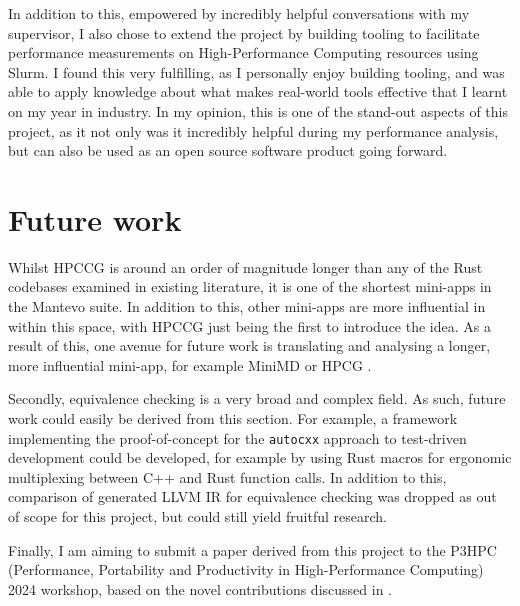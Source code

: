 In addition to this, empowered by incredibly helpful conversations with my supervisor, I also chose to extend the project by building tooling to facilitate performance measurements on High-Performance Computing resources using Slurm. I found this very fulfilling, as I personally enjoy building tooling, and was able to apply knowledge about what makes real-world tools effective that I learnt on my year in industry. In my opinion, this is one of the stand-out aspects of this project, as it not only was it incredibly helpful during my performance analysis, but can also be used as an open source software product going forward.


\section{Future work}
\label{sec:future-work}

Whilst HPCCG is around an order of magnitude longer than any of the Rust codebases examined in existing literature, it is one of the shortest mini-apps in the Mantevo suite. In addition to this, other mini-apps are more influential in within this space, with HPCCG just being the first to introduce the idea. As a result of this, one avenue for future work is translating and analysing a longer, more influential mini-app, for example MiniMD \cite{osti_1231191} or HPCG \cite{dongarra2015hpcg}.

Secondly, equivalence checking is a very broad and complex field. As such, future work could easily be derived from this section. For example, a framework implementing the proof-of-concept for the \texttt{autocxx} approach to test-driven development could be developed, for example by using Rust macros for ergonomic multiplexing between C++ and Rust function calls. In addition to this, comparison of generated LLVM IR for equivalence checking was dropped as out of scope for this project, but could still yield fruitful research.


Finally, I am aiming to submit a paper derived from this project to the P3HPC (Performance, Portability and Productivity in High-Performance Computing) 2024 workshop, based on the novel contributions discussed in .


